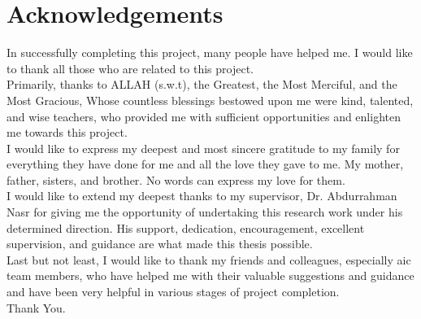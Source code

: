 \chapter*{Acknowledgements}

\noindent
In successfully completing this project, many people have helped me. I would like to thank all those who are related to this project. \\[4pt]

Primarily, thanks to ALLAH (s.w.t), the Greatest, the Most Merciful, and the Most Gracious,
Whose countless blessings bestowed upon me were kind, talented, and wise teachers, who
provided me with sufficient opportunities and enlighten me towards this project. \\[4pt]

I would like to express my deepest and most sincere gratitude to my family for everything they have done for me and all the love they gave to me. My mother, father, sisters, and brother. No words can express my love for them. \\[4pt]

I would like to extend my deepest thanks to my supervisor, Dr. Abdurrahman Nasr for
giving me the opportunity of undertaking this research work under his determined
direction. His support, dedication, encouragement, excellent supervision, and guidance
are what made this thesis possible. \\[4pt]

Last but not least, I would like to thank my friends and colleagues, especially \acrfull{aic} team members, who have helped me with their valuable suggestions and guidance and have been very helpful in various stages of project completion. \\[16pt]

\noindent
Thank You.